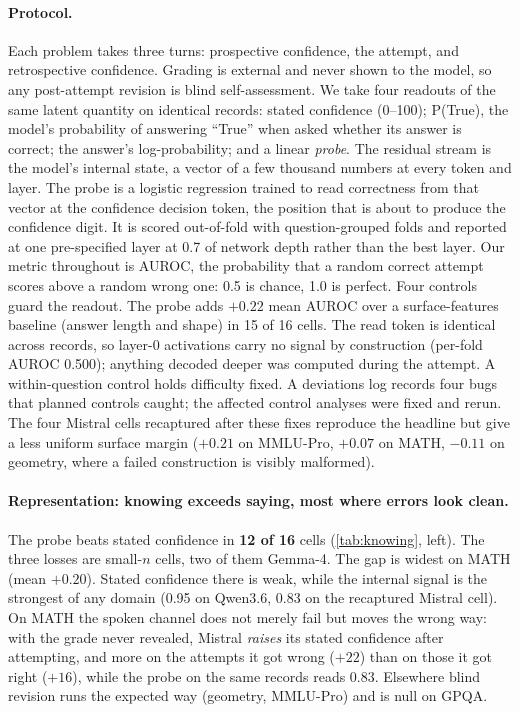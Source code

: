 \documentclass{article}
\begin{document}
\paragraph{Protocol.}
Each problem takes three turns: prospective confidence, the attempt, and retrospective confidence.
Grading is external and never shown to the model, so any post-attempt revision is blind self-assessment.
We take four readouts of the same latent quantity on identical records: stated confidence (0--100); P(True), the model's probability of answering ``True'' when asked whether its answer is correct; the answer's log-probability; and a linear \emph{probe}.
The residual stream is the model's internal state, a vector of a few thousand numbers at every token and layer.
The probe is a logistic regression trained to read correctness from that vector at the confidence decision token, the position that is about to produce the confidence digit.
It is scored out-of-fold with question-grouped folds and reported at one pre-specified layer at 0.7 of network depth rather than the best layer.
Our metric throughout is AUROC, the probability that a random correct attempt scores above a random wrong one: 0.5 is chance, 1.0 is perfect.
Four controls guard the readout.
The probe adds $+0.22$ mean AUROC over a surface-features baseline (answer length and shape) in 15 of 16 cells.
The read token is identical across records, so layer-0 activations carry no signal by construction (per-fold AUROC 0.500); anything decoded deeper was computed during the attempt.
A within-question control holds difficulty fixed.
A deviations log records four bugs that planned controls caught; the affected control analyses were fixed and rerun.
The four Mistral cells recaptured after these fixes reproduce the headline but give a less uniform surface margin ($+0.21$ on MMLU-Pro, $+0.07$ on MATH, $-0.11$ on geometry, where a failed construction is visibly malformed).

\paragraph{Representation: knowing exceeds saying, most where errors look clean.}
The probe beats stated confidence in \textbf{12 of 16} cells (\cref{tab:knowing}, left).
The three losses are small-$n$ cells, two of them Gemma-4.
The gap is widest on MATH (mean $+0.20$).
Stated confidence there is weak, while the internal signal is the strongest of any domain (0.95 on Qwen3.6, 0.83 on the recaptured Mistral cell).
On MATH the spoken channel does not merely fail but moves the wrong way: with the grade never revealed, Mistral \emph{raises} its stated confidence after attempting, and more on the attempts it got wrong ($+22$) than on those it got right ($+16$), while the probe on the same records reads 0.83.
Elsewhere blind revision runs the expected way (geometry, MMLU-Pro) and is null on GPQA.
\end{document}
